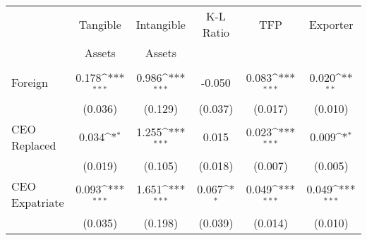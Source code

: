 {
\def\sym#1{\ifmmode^{#1}\else\(^{#1}\)\fi}
\begin{tabular}{l*{5}{c}}
\hline\hline
                    &\multicolumn{1}{c}{Tangible}&\multicolumn{1}{c}{Intangible}&\multicolumn{1}{c}{K-L Ratio}&\multicolumn{1}{c}{TFP}&\multicolumn{1}{c}{Exporter}\\
                    &\multicolumn{1}{c}{Assets} &\multicolumn{1}{c}{Assets} &\multicolumn{1}{c}{} &\multicolumn{1}{c}{} &\multicolumn{1}{c}{} \\
\hline
                    &                     &                     &                     &                       &  \\
Foreign             &       0.178\sym{***}&       0.986\sym{***}&      -0.050         &       0.083\sym{***}  &    0.020\sym{**}\\
                    &     (0.036)         &     (0.129)         &     (0.037)         &     (0.017)           &     (0.010)\\
CEO Replaced        &       0.034\sym{*}  &       1.255\sym{***}&       0.015         &       0.023\sym{***}  &       0.009\sym{*} \\
                    &     (0.019)         &     (0.105)         &     (0.018)         &     (0.007)           &     (0.005)        \\
CEO Expatriate      &       0.093\sym{***}&       1.651\sym{***}&       0.067\sym{*}  &       0.049\sym{***}  &       0.049\sym{***}\\
                    &     (0.035)         &     (0.198)         &     (0.039)         &     (0.014)           &     (0.010)         \\
\hline\hline
\end{tabular}
}
